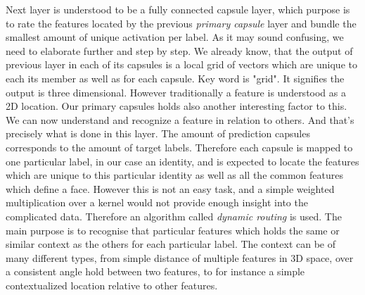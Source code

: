Next layer is understood to be a fully connected capsule layer, which purpose is to rate the features located by the previous \textit{primary capsule} layer and bundle the smallest amount of unique activation per label. As it may sound confusing, we need to elaborate further and step by step. We already know, that the output of previous layer in each of its capsules is a local grid of vectors which are unique to each its member as well as for each capsule. Key word is "grid". It signifies the output is three dimensional. However traditionally a feature is understood as a 2D location. Our primary capsules holds also another interesting factor to this. We can now understand and recognize a feature in relation to others. And that's precisely what is done in this layer. The amount of prediction capsules corresponds to the amount of target labels. Therefore each capsule is mapped to one particular label, in our case an identity, and is expected to locate the features which are unique to this particular identity as well as all the common features which define a face. However this is not an easy task, and a simple weighted multiplication over a kernel would not provide enough insight into the complicated data. Therefore an algorithm called \textit{dynamic routing} is used. The main purpose is to recognise that particular features which holds the same or similar context as the others for each particular label. The context can be of many different types, from simple distance of multiple features in 3D space, over a consistent angle hold between two features, to for instance a simple contextualized location relative to other features.
